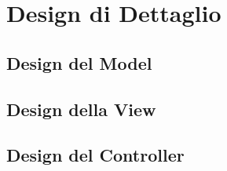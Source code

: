 
\newpage
\section{Design di Dettaglio}

\subsection{Design del Model}

\subsection{Design della View}

\subsection{Design del Controller}




